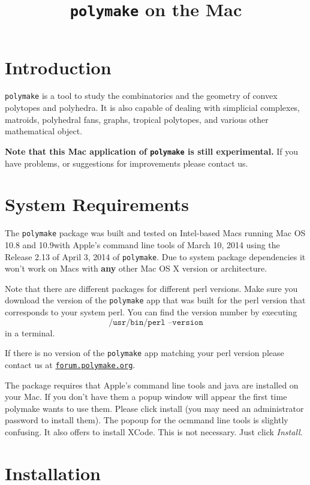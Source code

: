 \documentclass[a4paper]{amsart}
\title{\texttt{polymake} on the Mac\\\polymakeversion}
\newcommand{\macversion}{10.9}
\newcommand{\polymakeversion}{ Release 2.13 of April 3, 2014\xspace}
\newcommand{\polymake}{\texttt{polymake}\xspace}
\begin{document}
\maketitle
\parindent0pt

\section*{Introduction}

\polymake is a tool to study the combinatorics and the geometry of
convex polytopes and polyhedra. It is also capable of dealing with
simplicial complexes, matroids, polyhedral fans, graphs, tropical polytopes, and various other mathematical object.

\textbf{Note that this Mac application of \polymake is still
  experimental.} If you have problems, or suggestions for improvements
please contact us.

\section*{System Requirements}

The \polymake package was built and tested on Intel-based Macs
running Mac OS 10.8 and \macversion with Apple's command line tools of March 10, 2014 using the \polymakeversion of
\polymake. Due to system package dependencies it won't work on Macs
with \textbf{any} other Mac OS X version or architecture.

Note that there are different packages for different perl versions. Make sure you download the version of the \polymake app that was built for the perl version that corresponds to your system perl. You can find the version number by executing
\[\texttt{/usr/bin/perl --version}\] in a terminal.

If there is no version of the \polymake app matching your perl version please contact us at \href{http://forum.polymake.org}{\tt forum.polymake.org}.

\bigskip
The package requires that Apple's command line tools and java are installed on your Mac. If you don't have them a popup window will appear the first time polymake wants to use them. Please click install (you may need an administrator password to install them). The popoup for the ocmmand line tools is slightly confusing. It also offers to install XCode. This is not necessary. Just click \emph{Install}.


\section*{Installation}
\end{document}
